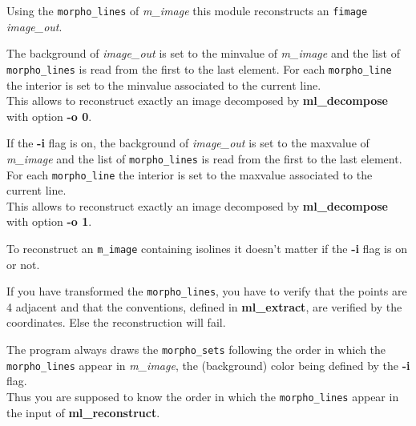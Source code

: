 Using the {\tt morpho\_lines} of {\em m\_image} this 
module reconstructs an {\tt fimage} {\em image\_out}.

\smallskip

The background of {\em image\_out} is set to the minvalue
of {\em m\_image} and the list of {\tt morpho\_lines}
is read from the first to the last element. 
For each {\tt morpho\_line} the interior is set to
the minvalue associated to the current line.\\
This allows to reconstruct exactly an image decomposed
by {\bf ml\_decompose} with option {\bf -o 0}.

\medskip

If the {\bf -i} flag is on, the background of {\em image\_out} 
is set to the maxvalue of {\em m\_image} and the list of 
{\tt morpho\_lines} is read from the first to the last element.
For each {\tt morpho\_line} the interior is set to the
maxvalue associated to the current line.\\
This allows to reconstruct exactly an image decomposed
by {\bf ml\_decompose} with option {\bf -o 1}.

\medskip

To reconstruct an {\tt m\_image} containing isolines
it doesn't matter if the {\bf -i} flag is on or not.

\medskip

If you have transformed the {\tt morpho\_lines}, you
have to verify  that the points are 4 adjacent and 
that the conventions, defined in {\bf ml\_extract}, are verified
by the coordinates. Else the reconstruction will fail.

\smallskip

The program always draws the {\tt morpho\_sets} following the order
in which the {\tt morpho\_lines} appear in {\em m\_image}, 
the (background) color being defined by the {\bf -i} flag.\\
Thus you are supposed to know the order in which the {\tt morpho\_lines}
 appear in the input of {\bf ml\_reconstruct}.
